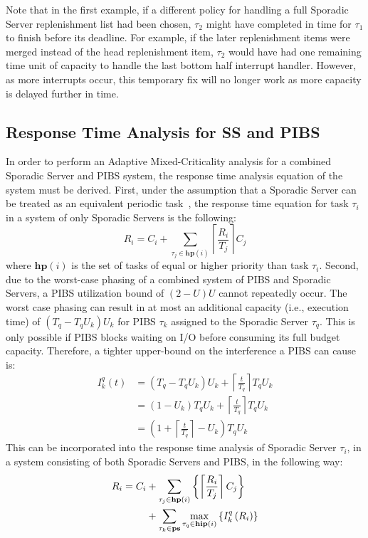 Note that in the first example, if a different policy for handling a full
Sporadic Server replenishment list had been chosen, $\tau_2$ might have
completed in time for $\tau_1$ to finish before its deadline.  For example, if
the later replenishment items were merged instead of the head replenishment
item, $\tau_2$ would have had one remaining time unit of capacity to handle
the last bottom half interrupt handler.  However, as more interrupts occur,
this temporary fix will no longer work as more capacity is delayed further in
time.

\subsection{Response Time Analysis for SS and PIBS}

In order to perform an Adaptive Mixed-Criticality analysis for a combined
Sporadic Server and PIBS system, the response time analysis equation of the
system must be derived.  First, under the assumption that a Sporadic Server
can be treated as an equivalent periodic task~\cite{Sprunt90}, the response
time equation for task $\tau_i$ in a system of only Sporadic Servers is the
following:
\[
R_i = C_i +
\sum_{\tau_j\in\mathbf{hp}\left(i\right)}{\left\lceil\frac{R_i}{T_j}\right\rceil
  C_j}
\]
where $\mathbf{hp}\left(i\right)$ is the set of tasks of equal or higher
priority than task $\tau_i$. Second, due to the worst-case phasing of a
combined system of PIBS and Sporadic Servers, a PIBS utilization bound of
$\left(2-U\right)U$ cannot repeatedly occur.  The worst case phasing can
result in at most an additional capacity (i.e., execution time) of $\left(T_q{-}
T_q U_k\right)U_k$ for PIBS $\tau_k$ assigned to the Sporadic Server
$\tau_q$. This is only possible if PIBS blocks waiting on I/O before consuming
its full budget capacity.
Therefore, a
tighter upper-bound on the interference a PIBS can cause is:
\begin{align*}
I^q_k\left(t\right)
&= \left(T_q{-}T_q U_k\right)U_k + \left\lceil \frac{t}{T_q} \right\rceil T_q U_k \\
&= \left(1-U_k\right)T_q U_k + \left\lceil \frac{t}{T_q} \right\rceil T_q U_k \\
&= \left(1 + \left\lceil \frac{t}{T_q} \right\rceil - U_k \right) T_q U_k
\end{align*}
This can be incorporated into the response time analysis of Sporadic Server
$\tau_i$, in a system consisting of both Sporadic Servers and PIBS, in the
following way:
\begin{align} \label{eq:ss_rtb}
R_i = C_i &+ \sum_{\tau_j\in\mathbf{hp}\left(i\right)} \left\{ \left\lceil
    \frac{R_i}{T_j} \right\rceil C_j\right\} \notag \\ & +
\sum_{\tau_k \in \mathbf{ps}}\max_{\tau_q \in
  \mathbf{hip}\left(i\right)}\left\{I_k^q\left(R_i\right)\right\}
\end{align}
